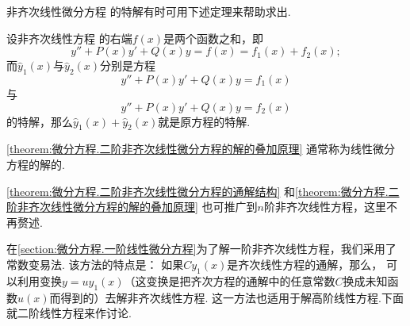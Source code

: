 非齐次线性微分方程  的特解有时可用下述定理来帮助求出.
\begin{theorem}\label{theorem:微分方程.二阶非齐次线性微分方程的解的叠加原理}
设非齐次线性方程  的右端\(f(x)\)是两个函数之和，即\[
y''+P(x)y'+Q(x)y
=f(x)
=f_1(x)+f_2(x);
\]而\(\hat{y}_1(x)\)与\(\hat{y}_2(x)\)分别是方程\[
y''+P(x)y'+Q(x)y=f_1(x)
\]与\[
y''+P(x)y'+Q(x)y=f_2(x)
\]的特解，那么\(\hat{y}_1(x)+\hat{y}_2(x)\)就是原方程的特解.
\end{theorem}

\cref{theorem:微分方程.二阶非齐次线性微分方程的解的叠加原理}
通常称为线性微分方程的解的.

\cref{theorem:微分方程.二阶非齐次线性微分方程的通解结构} 和\cref{theorem:微分方程.二阶非齐次线性微分方程的解的叠加原理} 也可推广到\(n\)阶非齐次线性方程，这里不再赘述.

在\cref{section:微分方程.一阶线性微分方程}为了解一阶非齐次线性方程，我们采用了常数变易法.
该方法的特点是：
如果\(C y_1(x)\)是齐次线性方程的通解，那么，
可以利用变换\(y = u y_1(x)\)（这变换是把齐次方程的通解中的任意常数\(C\)换成未知函数\(u(x)\)而得到的）去解非齐次线性方程.
这一方法也适用于解高阶线性方程.下面就二阶线性方程来作讨论.

